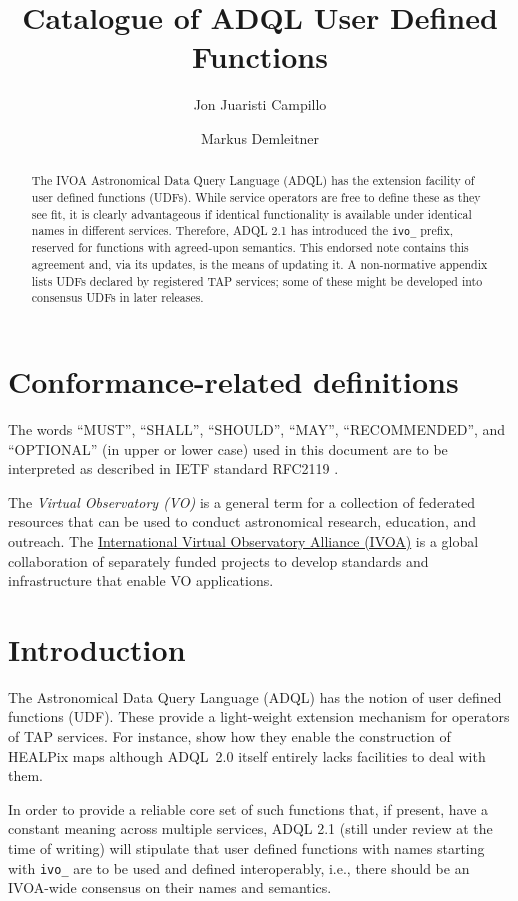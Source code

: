 \documentclass[11pt,a4paper]{ivoa}
\title{Catalogue of ADQL User Defined Functions}
\author[https://wiki.ivoa.net/twiki/bin/view/IVOA/JonJuaristiCampillo]{Jon Juaristi Campillo}
\author[https://wiki.ivoa.net/twiki/bin/view/IVOA/MarkusDemleitner]{Markus Demleitner}
\begin{document}
\begin{abstract}
The IVOA Astronomical Data Query Language (ADQL) has the extension
facility of user defined functions (UDFs).  While service operators are
free to define these as they see fit, it is clearly advantageous if
identical functionality is available under identical names in different
services.  Therefore, ADQL 2.1 has introduced the \verb|ivo_| prefix,
reserved for functions with agreed-upon semantics.  This endorsed note
contains this agreement and, via its updates, is the means of updating
it.  A non-normative appendix lists UDFs declared by registered TAP
services; some of these might be developed into consensus UDFs in later
releases.
\end{abstract}


\section*{Conformance-related definitions}

The words ``MUST'', ``SHALL'', ``SHOULD'', ``MAY'', ``RECOMMENDED'', and
``OPTIONAL'' (in upper or lower case) used in this document are to be
interpreted as described in IETF standard RFC2119 \citep{std:RFC2119}.

The \emph{Virtual Observatory (VO)} is a
general term for a collection of federated resources that can be used
to conduct astronomical research, education, and outreach.
The \href{http://www.ivoa.net}{International
Virtual Observatory Alliance (IVOA)} is a global
collaboration of separately funded projects to develop standards and
infrastructure that enable VO applications.


\section{Introduction}

The Astronomical Data Query Language (ADQL) \citep{2008ivoa.spec.1030O}
has the notion of user defined functions (UDF).  These provide a
light-weight extension mechanism for operators of TAP services.  
For instance, \citet{2016arXiv161109190T} show how they enable the
construction of HEALPix maps although ADQL~2.0 itself entirely lacks
facilities to deal with them.

In order to provide a reliable core set of such functions that, if
present, have a constant meaning across multiple services, ADQL 2.1
(still under review at the time of writing) will stipulate that user
defined functions with names starting with \verb|ivo_| are to be used
and defined interoperably, i.e., there should be an IVOA-wide consensus
on their names and semantics. 
\end{document}
